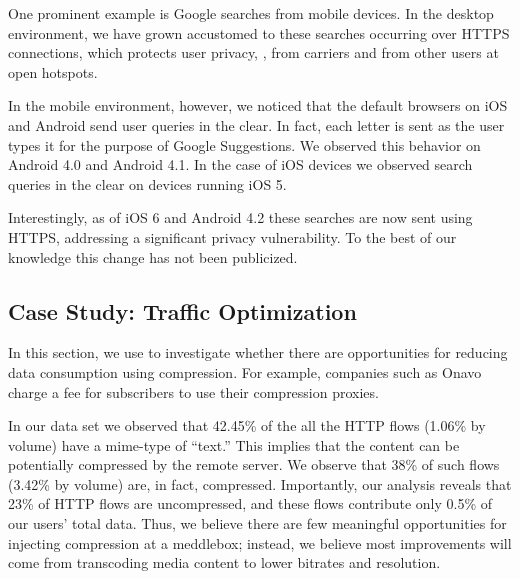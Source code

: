 One prominent example is Google searches from mobile devices. In the 
desktop environment, we have grown accustomed to these searches 
occurring over HTTPS connections, which protects user privacy, \eg, from 
carriers and from other users at open \wifi hotspots. 

In the mobile environment, however, we noticed that the default 
browsers on iOS and Android send user queries in the clear. In fact, 
each letter is sent as the user types it for the purpose of Google Suggestions. 
We
observed this behavior on Android 4.0 and Android 4.1. In the case of iOS devices we observed search queries
in the clear on devices running iOS 5. 

Interestingly, as of iOS 6 and Android 4.2 these searches are now sent using HTTPS, addressing 
a significant privacy vulnerability. To the best of our knowledge this 
change has not been publicized. 

%




\subsection{Case Study: Traffic Optimization}
\label{sec:case-study-compression}
In this section, we use \meddle to investigate whether there 
are opportunities for reducing data consumption using compression. 
For example, companies such as Onavo charge a fee for subscribers 
to use their compression proxies. 

In our data set we observed that 42.45\% of the all the HTTP flows (1.06\% by volume) have 
a mime-type of ``text.'' This implies that the content can be potentially compressed by the 
remote server. We observe that 38\% of such flows (3.42\% by volume) are, in fact, compressed. 
Importantly, our analysis reveals that 23\% of HTTP flows are uncompressed, and these flows 
contribute only 0.5\% of our users' total data. Thus, we believe there are few meaningful 
opportunities for injecting compression at a meddlebox; instead, we believe most improvements 
will come from transcoding media content to lower bitrates and resolution. 

